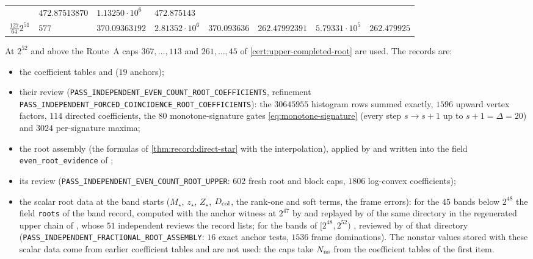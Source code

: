 \begin{certificate}
\begin{center}
\begin{tabular}{@{}llllllll@{}}
 & $472.87513870$ & $1.13250\cdot10^{6}$ & $472.875143$\\
$\frac{127}{64}2^{51}$ & $577$ & $370.09363192$ & $2.81352\cdot10^{6}$ & $370.093636$
 & $262.47992391$ & $5.79331\cdot10^{5}$ & $262.479925$\\
\bottomrule
\end{tabular}
\end{center}
At $2^{52}$ and above the Route~A caps $367,\dots,113$ and $261,\dots,45$
of \cref{cert:upper-completed-root} are used. The records are:
\begin{itemize}
\item the coefficient tables
 and  ($19$ anchors);
\item their review 
 (\texttt{PASS\_INDEPENDENT\_EVEN\_COUNT\_ROOT\_COEFFICIENTS}, refinement
 \texttt{PASS\_INDEPENDENT\_FORCED\_COINCIDENCE\_ROOT\_COEFFICIENTS}): the
 $30645955$ histogram rows summed exactly, $1596$ upward vertex factors, $114$
 directed coefficients, the $80$ monotone-signature gates \eqref{eq:monotone-signature}
 (every step $s\to s+1$ up to $s+1=\Delta=20$) and
 $3024$ per-signature maxima;
\item the root assembly 
 (the formulas of \cref{thm:record:direct-star} with the interpolation), applied by
  and written into
 the field \texttt{even\_root\_evidence} of
 ;
\item its review 
 (\texttt{PASS\_INDEPENDENT\_EVEN\_COUNT\_ROOT\_UPPER}: $602$ fresh root and block
 caps, $1806$ log-convex coefficients);
\item the scalar root data at the band starts ($M_\star$, $z_\star$, $Z_\star$,
 $D_{\rm col}$, the rank-one and soft terms, the frame errors): for the $45$ bands below
 $2^{48}$ the field \texttt{roots} of the band record, computed with the anchor witness
 at $2^{47}$ by  and replayed
 by  of the same directory in the regenerated upper chain
 of , whose $51$ independent reviews the record
  lists; for the bands of
 $[2^{48},2^{52})$ ,
 reviewed by  of that directory
 (\texttt{PASS\_INDEPENDENT\_FRACTIONAL\_ROOT\_ASSEMBLY}: $16$ exact anchor tests,
 $1536$ frame dominations). The nonstar values stored with these scalar data come
 from earlier coefficient tables and are not used: the caps take $N_{\rm ns}$ from the
 coefficient tables of the first item.
\end{itemize}
\end{certificate}

